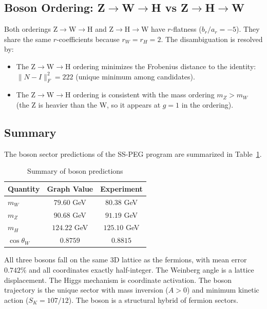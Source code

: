 \subsection{Boson Ordering: Z$\to$W$\to$H vs Z$\to$H$\to$W}\label{sec:boson_ordering}

Both orderings Z$\to$W$\to$H and Z$\to$H$\to$W have $r$-flatness ($b_r/a_r = -5$). They share the same $r$-coefficients because $r_W = r_H = 2$. The disambiguation is resolved by:
\begin{itemize}
\item The Z$\to$W$\to$H ordering minimizes the Frobenius distance to the identity: $\|N - I\|_F^2 = 222$ (unique minimum among candidates).
\item The Z$\to$W$\to$H ordering is consistent with the mass ordering $m_Z > m_W$ (the Z is heavier than the W, so it appears at $g = 1$ in the ordering).
\end{itemize}

\subsection{Summary}\label{sec:boson_summary}

The boson sector predictions of the SS-PEG program are summarized in Table~\ref{tab:boson_summary}.

\begin{table}[h]
\centering
\caption{Summary of boson predictions}
\label{tab:boson_summary}
\begin{tabular}{lcc}
\hline\hline
Quantity & Graph Value & Experiment \\
\hline
$m_W$ & $79.60$ GeV & $80.38$ GeV \\
$m_Z$ & $90.68$ GeV & $91.19$ GeV \\
$m_H$ & $124.22$ GeV & $125.10$ GeV \\
$\cos\theta_W$ & $0.8759$ & $0.8815$ \\
\hline\hline
\end{tabular}
\end{table}

All three bosons fall on the same 3D lattice as the fermions, with mean error $0.742\%$ and all coordinates exactly half-integer. The Weinberg angle is a lattice displacement. The Higgs mechanism is coordinate activation. The boson trajectory is the unique sector with mass inversion ($A > 0$) and minimum kinetic action ($S_K = 107/12$). The boson is a structural hybrid of fermion sectors.
